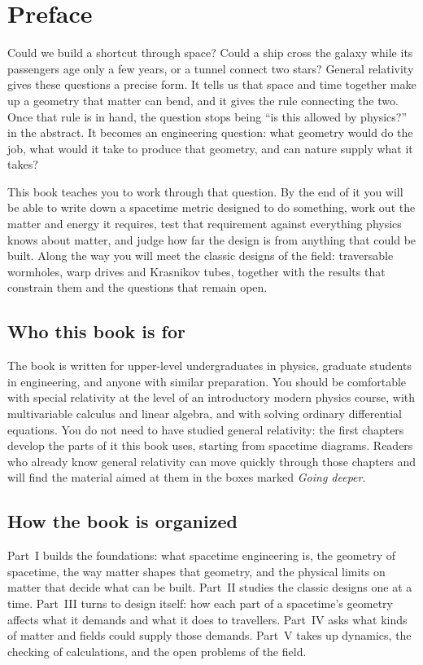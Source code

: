 \chapter{Preface}

Could we build a shortcut through space? Could a ship cross the galaxy while
its passengers age only a few years, or a tunnel connect two stars? General
relativity gives these questions a precise form. It tells us that space and
time together make up a geometry that matter can bend, and it gives the rule
connecting the two. Once that rule is in hand, the question stops being
\enquote{is this allowed by physics?} in the abstract. It becomes an
engineering question: what geometry would do the job, what would it take to
produce that geometry, and can nature supply what it takes?

This book teaches you to work through that question. By the end of it you
will be able to write down a spacetime metric designed to do something, work out the
matter and energy it requires, test that requirement against everything
physics knows about matter, and judge how far the design is from anything
that could be built. Along the way you will meet the classic designs of the
field: traversable wormholes, warp drives and Krasnikov tubes, together with
the results that constrain them and the questions that remain open.

\section*{Who this book is for}

The book is written for upper-level undergraduates in physics, graduate
students in engineering, and anyone with similar preparation. You should be
comfortable with special relativity at the level of an introductory modern
physics course, with multivariable calculus and linear algebra, and with
solving ordinary differential equations. You do not need to have studied
general relativity: the first chapters develop the parts of it this book
uses, starting from spacetime diagrams. Readers who already know general
relativity can move quickly through those chapters and will find the
material aimed at them in the boxes marked \emph{Going deeper}.

\section*{How the book is organized}

Part~I builds the foundations: what spacetime engineering is, the geometry of
spacetime, the way matter shapes that geometry, and the physical limits on
matter that decide what can be built. Part~II studies the classic designs one
at a time. Part~III turns to design itself: how each part of a spacetime's
geometry affects what it demands and what it does to travellers. Part~IV asks
what kinds of matter and fields could supply those demands. Part~V takes up
dynamics, the checking of calculations, and the open problems of the field.

